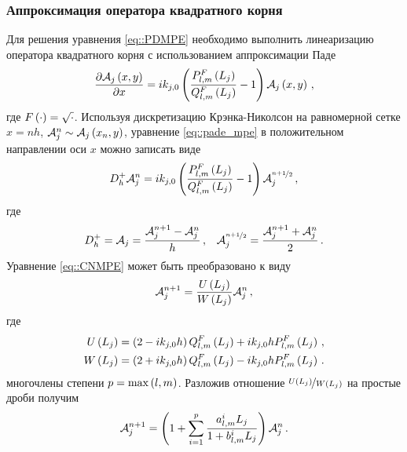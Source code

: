 \documentclass[../document.tex]{subfiles}
\begin{document}
        \subsubsection{Аппроксимация оператора квадратного корня}
            \par Для решения уравнения \eqref{eq::PDMPE} необходимо выполнить линеаризацию оператора квадратного корня с использованием аппроксимации Паде
            \begin{equation}\label{eq::pade_mpe}
                \frac{\partial\mathcal{A}_j\left(x,y\right)}{\partial x}=ik_{j,0}\left(\frac{P_{l,m}^F\left(L_j\right)}{Q_{l,m}^F\left(L_j\right)}-1\right)\mathcal{A}_j\left(x,y\right)\,,
            \end{equation}
            где $F\left(\cdot\right)=\sqrt{\cdot}$. Используя дискретизацию Крэнка-Николсон \cite{crank} на равномерной сетке $x=nh$, $\mathcal{A}_j^n\sim\mathcal{A}_j\left(x_n,y\right)$, уравнение \eqref{eq::pade_mpe} в положительном направлении оси $x$ можно записать виде
            \begin{equation}\label{eq::CNMPE}
                D_h^+\mathcal{A}_j^n=ik_{j,0}\left(\frac{P_{l,m}^F\left(L_j\right)}{Q_{l,m}^F\left(L_j\right)}-1\right)\mathcal{A}_j^{\nicefrac{n+1}{2}}\,,
            \end{equation}
            где 
            \begin{align*}
                D_h^+=\mathcal{A}_j=\frac{\mathcal{A}_j^{n+1}-\mathcal{A}_j^n}{h}\,,&&\mathcal{A}_j^{\nicefrac{n+1}{2}}=\frac{\mathcal{A}_j^{n+1}+\mathcal{A}_j^n}{2}\,.
            \end{align*}
            Уравнение \eqref{eq::CNMPE} может быть преобразовано к виду
            \begin{equation}
                \mathcal{A}_j^{n+1}=\frac{U\left(L_j\right)}{W\left(L_j\right)}\mathcal{A}_j^n\,,
            \end{equation}
            где
            \begin{align*}
                U\left(L_j\right)&=\left(2-ik_{j,0}h\right)Q_{l,m}^F\left(L_j\right)+ik_{j,0}hP_{l,m}^F\left(L_j\right)\,,\\
                W\left(L_j\right)&=\left(2+ik_{j,0}h\right)Q_{l,m}^F\left(L_j\right)-ik_{j,0}hP_{l,m}^F\left(L_j\right)\,.
            \end{align*}
            многочлены степени $p=\max\left(l,m\right)$. Разложив отношение $\nicefrac{U\left(L_j\right)}{W\left(L_j\right)}$ на простые дроби получим
            \begin{equation}\label{eq::dPDMPE}
                \mathcal{A}_j^{n+1}=\left(1+\sum\limits_{i=1}^p\frac{a_{l,m}^iL_j}{1+b_{l,m}^iL_j}\right)\mathcal{A}_j^n\,.
            \end{equation}
\end{document}
